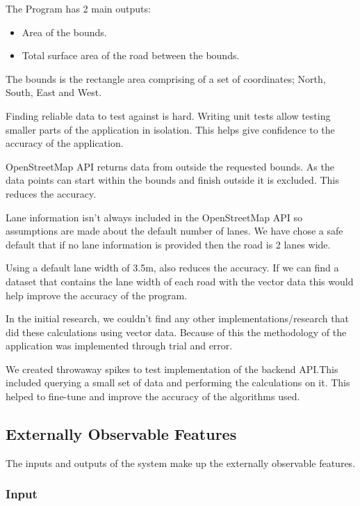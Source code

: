 \documentclass[a4paper,11pt]{article}
\begin{document}
The Program has 2 main outputs:

\begin{itemize}
  \item Area of the bounds.
  \item Total surface area of the road between the bounds.
\end{itemize}

The bounds is the rectangle area comprising of a set of coordinates; North,
South, East and West.

Finding reliable data to test against is hard. Writing unit tests allow testing
smaller parts of the application in isolation. This helps give confidence to the
accuracy of the application.

OpenStreetMap API returns data from outside the requested bounds. As the data
points can start within the bounds and finish outside it is excluded. This
reduces the accuracy.

Lane information isn't always included in the OpenStreetMap API so assumptions
are made about the default number of lanes. We have chose a safe default that if
no lane information is provided then the road is 2 lanes wide.

Using a default lane width of 3.5m, also reduces the accuracy. If we can find a
dataset that contains the lane width of each road with the vector data this
would help improve the accuracy of the program.

In the initial research, we couldn't find any other implementations/research
that did these calculations using vector data. Because of this the methodology
of the application was implemented through trial and error.

We created throwaway spikes to test implementation of the backend API.\@ This
included querying a small set of data and performing the calculations on it.
This helped to fine-tune and improve the accuracy of the algorithms used.

\subsection{Externally Observable Features}

The inputs and outputs of the system make up the externally observable
features.

\subsubsection{Input}
\end{document}
